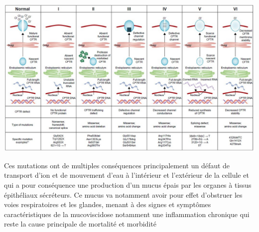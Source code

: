 \begin{center}
\includegraphics[scale=0.4]{gfx/mutation.jpg} 
\captionsetup{type=figure}
       \label{mutation}
\end{center}
 
Ces mutations ont de multiples conséquences principalement un défaut de transport d’ion et de mouvement d’eau à l’intérieur et l’extérieur de la cellule et qui a pour conséquence une production d’un mucus épais par les organes à tissus épithéliaux sécréteurs. Ce mucus va notamment avoir pour effet d’obstruer les voies respiratoires et les glandes, menant à des signes et symptômes caractéristiques de la mucoviscidose notamment une inflammation chronique qui reste la cause principale de mortalité et morbidité



